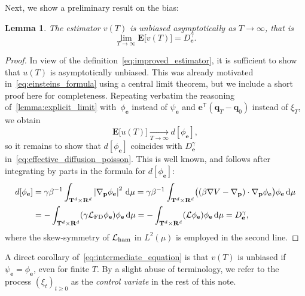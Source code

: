 \documentclass[11pt,a4paper]{article}
\newcommand{\expect}[0]{\mathbf{E}}
\newcommand{\real}{\mathbf R}
\newcommand{\torus}{\mathbf T}
\newcommand{\grad}{\nabla}
\newcommand{\vect}[1]{\boldsymbol{\mathbf #1}}
\renewcommand{\d}{\mathrm d}
\renewcommand{\t}{\mathsf T}
\theoremstyle{plain}
\newtheorem{lemma}[theorem]{Lemma}
\numberwithin{equation}{section}
\renewcommand{\geq}{\geqslant}
\begin{document}
Next, we show a preliminary result on the bias:
\begin{lemma}
    \label{lemma:asymptotic_bias}
    The estimator $v(T)$ is unbiased asymptotically as $T \to \infty$,
    that is
    \begin{equation}
        \label{eq:estimator_is_unbiased}
        \lim_{T \to \infty} \expect \bigl[v(T)\bigr]
        = D^{\gamma}_{\vect e}.
    \end{equation}
\end{lemma}
\begin{proof}
    In view of the definition~\eqref{eq:improved_estimator},
    it is sufficient to show that $u(T)$ is asymptotically unbiased.
    This was already motivated in~\eqref{eq:einsteins_formula} using a central limit theorem,
    but we include a short proof here for completeness.
    Repeating verbatim the reasoning of~\cref{lemma:explicit_limit} with~$\phi_{\vect e}$ instead of $\psi_{\vect e}$ and $\vect e^\t (\vect q_T - \vect q_0)$ instead of $\xi_T$,
    we obtain
    \begin{equation}
        \label{eq:intermediate_equation}
        \expect \bigl[u(T)\bigr]
        \xrightarrow[T \to \infty]{} d[\phi_{\vect e}],
    \end{equation}
    so it remains to show that $d[\phi_{\vect e}]$ coincides with $D^{\gamma}_{\vect e}$ in~\eqref{eq:effective_diffusion_poisson}.
    This is well known,
    and follows after integrating by parts in the formula for $d[\phi_{\vect e}]$:
    \begin{align*}
        d[\phi_{\vect e}]
        &= \gamma \beta^{-1} \int_{\torus^d \times \real^d} \abs{\grad_{\vect p} \phi_{\vect e}}^2 \, \d \mu
        = \gamma \beta^{-1} \int_{\torus^d \times \real^d} \bigl((\beta \grad V - \grad_{\vect p}) \cdot \grad_{\vect p}\phi_{\vect e} \bigr) \phi_{\vect e} \, \d \mu  \\
        &= -\int_{\torus^d \times \real^d} (\gamma \mathcal L_{\rm FD} \phi_{\vect e}) \phi_{\vect e} \, \d \mu
        = -\int_{\torus^d \times \real^d} (\mathcal L \phi_{\vect e}) \phi_{\vect e} \, \d \mu
        = D^{\gamma}_{\vect e},
    \end{align*}
    where the skew-symmetry of $\mathcal L_{\rm ham}$ in $L^2(\mu)$ is employed in the second line.
\end{proof}
A direct corollary of~\eqref{eq:intermediate_equation} is that $v(T)$ is unbiased if $\psi_{\vect e} = \phi_{\vect e}$, even for finite $T$.
By a slight abuse of terminology,
we refer to the process $(\xi_t)_{t \geq 0}$ as the \emph{control variate} in the rest of this note.
\end{document}
